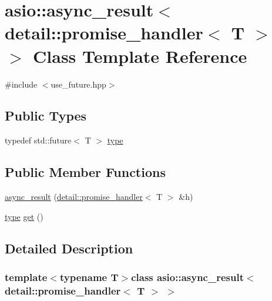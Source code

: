 \hypertarget{classasio_1_1async__result_3_01detail_1_1promise__handler_3_01_t_01_4_01_4}{}\section{asio\+:\+:async\+\_\+result$<$ detail\+:\+:promise\+\_\+handler$<$ T $>$ $>$ Class Template Reference}
\label{classasio_1_1async__result_3_01detail_1_1promise__handler_3_01_t_01_4_01_4}


{\ttfamily \#include $<$use\+\_\+future.\+hpp$>$}

\subsection*{Public Types}
\begin{DoxyCompactItemize}
\item 
typedef std\+::future$<$ T $>$ \hyperlink{classasio_1_1async__result_3_01detail_1_1promise__handler_3_01_t_01_4_01_4_ae101840b0887943caf834bde0f343797}{type}
\end{DoxyCompactItemize}
\subsection*{Public Member Functions}
\begin{DoxyCompactItemize}
\item 
\hyperlink{classasio_1_1async__result_3_01detail_1_1promise__handler_3_01_t_01_4_01_4_aef00dd7e5af6e04440c2e23e6a05f5e4}{async\+\_\+result} (\hyperlink{classasio_1_1detail_1_1promise__handler}{detail\+::promise\+\_\+handler}$<$ T $>$ \&h)
\item 
\hyperlink{classasio_1_1async__result_3_01detail_1_1promise__handler_3_01_t_01_4_01_4_ae101840b0887943caf834bde0f343797}{type} \hyperlink{classasio_1_1async__result_3_01detail_1_1promise__handler_3_01_t_01_4_01_4_af67bc306c6eae718269250d6b5172d71}{get} ()
\end{DoxyCompactItemize}


\subsection{Detailed Description}
\subsubsection*{template$<$typename T$>$class asio\+::async\+\_\+result$<$ detail\+::promise\+\_\+handler$<$ T $>$ $>$}



